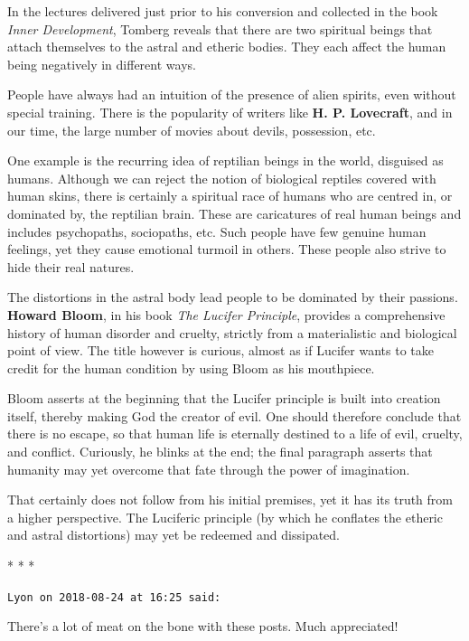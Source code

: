 In the lectures delivered just prior to his conversion and collected in the book \emph{Inner Development}, Tomberg reveals that there are two spiritual beings that attach themselves to the astral and etheric bodies. They each affect the human being negatively in different ways.

People have always had an intuition of the presence of alien spirits, even without special training. There is the popularity of writers like \textbf{H. P. Lovecraft}, and in our time, the large number of movies about devils, possession, etc.

One example is the recurring idea of reptilian beings in the world, disguised as humans. Although we can reject the notion of biological reptiles covered with human skins, there is certainly a spiritual race of humans who are centred in, or dominated by, the reptilian brain. These are caricatures of real human beings and includes psychopaths, sociopaths, etc. Such people have few genuine human feelings, yet they cause emotional turmoil in others. These people also strive to hide their real natures.

The distortions in the astral body lead people to be dominated by their passions. \textbf{Howard Bloom}, in his book \emph{The Lucifer Principle}, provides a comprehensive history of human disorder and cruelty, strictly from a materialistic and biological point of view. The title however is curious, almost as if Lucifer wants to take credit for the human condition by using Bloom as his mouthpiece.

Bloom asserts at the beginning that the Lucifer principle is built into creation itself, thereby making God the creator of evil. One should therefore conclude that there is no escape, so that human life is eternally destined to a life of evil, cruelty, and conflict. Curiously, he blinks at the end; the final paragraph asserts that humanity may yet overcome that fate through the power of imagination.

That certainly does not follow from his initial premises, yet it has its truth from a higher perspective. The Luciferic principle (by which he conflates the etheric and astral distortions) may yet be redeemed and dissipated.




\begin{center}* * *\end{center}

\begin{footnotesize}\begin{sffamily}



\texttt{Lyon on 2018-08-24 at 16:25 said: }

There's a lot of meat on the bone with these posts. Much appreciated!


\end{sffamily}\end{footnotesize}
